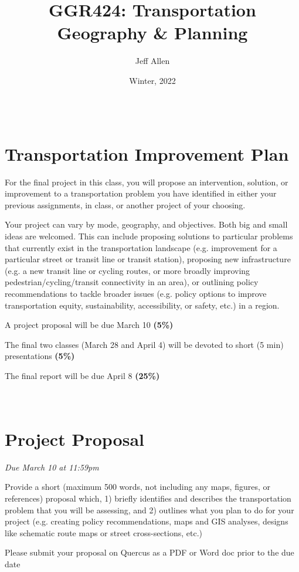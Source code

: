 \documentclass[11pt]{article}
\title{\textbf{GGR424: Transportation Geography \& Planning}}
\author{Jeff Allen}
\date{Winter, 2022}
\begin{document}
	
	\allsectionsfont{\sffamily}
	
	\section*{\\Transportation Improvement Plan}
	
	
	For the final project in this class, you will propose an intervention, solution, or improvement to a transportation problem you have identified in either your previous assignments, in class, or another project of your choosing. 
	
	Your project can vary by mode, geography, and objectives. Both big and small ideas are welcomed. This can include proposing solutions to particular problems that currently exist in the transportation landscape (e.g. improvement for a particular street or transit line or transit station), proposing new infrastructure (e.g. a new transit line or cycling routes, or more broadly improving pedestrian/cycling/transit connectivity in an area), or outlining policy recommendations to tackle broader issues (e.g. policy options to improve transportation equity, sustainability, accessibility, or safety, etc.) in a region.
	
	A project proposal will be due March 10 \textbf{(5\%)}
	
	The final two classes (March 28 and April 4) will be devoted to short (5 min) presentations \textbf{(5\%)}
	
	The final report will be due April 8 \textbf{(25\%)}
	
	
	\newpage
	
	
	
	
	
	
	\section*{\\Project Proposal}
	
	\textit{Due March 10 at 11:59pm}
	
	Provide a short (maximum 500 words, not including any maps, figures, or references) proposal which, 1) briefly identifies and describes the transportation problem that you will be assessing, and 2) outlines what you plan to do for your project (e.g. creating policy recommendations, maps and GIS analyses, designs like schematic route maps or street cross-sections, etc.)
	
	Please submit your proposal on Quercus as a PDF or Word doc prior to the due date
\end{document}
